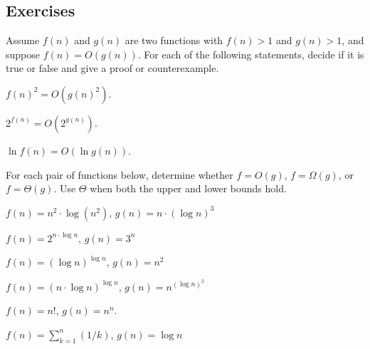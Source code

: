 \subsection*{Exercises}
\begin{exercises}

\item
Assume $f(n)$ and $g(n)$ are two functions with $f(n)>1$ and $g(n)>1$,
and suppose $f(n)=O(g(n))$.
For each of the following statements, decide if it is true or false and
give a proof or counterexample.
\begin{exercises}
\item $f(n)^2 = O(g(n)^2)$.
\item $2^{f(n)} = O(2^{g(n)})$.
\item $ \ln f(n) = O(\ln g(n))$.
\end{exercises}

\item
For each pair of functions below, determine whether $f = O(g)$,
$f = \Omega(g)$, or $f = \Theta(g)$.
Use $\Theta$ when both the upper and lower bounds hold.
\begin{exercises}
\item $f(n) = n^2\cdot \log(n^2)$, $g(n) = n \cdot (\log n)^3$
\item $f(n) = 2^{n\cdot \log n}$, $g(n) = 3^{n}$
\item $f(n) = (\log n)^{\log n}$, $g(n) = n^2$
\item $f(n) = (n\cdot \log n)^{\log n}$, $g(n) = n^{(\log n)^2}$
\item $f(n) = n!$, $g(n) = n^n$.
\item $f(n) = \sum_{k=1}^n (1/k)$, $g(n) = \log n$
\end{exercises}


\end{exercises}

